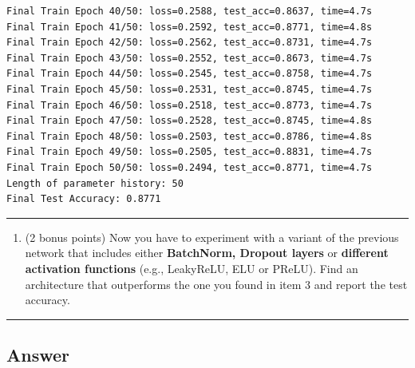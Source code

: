 \documentclass[
  letterpaper,
  DIV=11,
  numbers=noendperiod]{scrartcl}
\newenvironment{Shaded}{\begin{snugshade}}{\end{snugshade}}
\providecommand{\tightlist}{%
  \setlength{\itemsep}{0pt}\setlength{\parskip}{0pt}}\usepackage{longtable,booktabs,array}
\begin{document}
\begin{verbatim}
Final Train Epoch 40/50: loss=0.2588, test_acc=0.8637, time=4.7s
Final Train Epoch 41/50: loss=0.2592, test_acc=0.8771, time=4.8s
Final Train Epoch 42/50: loss=0.2562, test_acc=0.8731, time=4.7s
Final Train Epoch 43/50: loss=0.2552, test_acc=0.8673, time=4.7s
Final Train Epoch 44/50: loss=0.2545, test_acc=0.8758, time=4.7s
Final Train Epoch 45/50: loss=0.2531, test_acc=0.8745, time=4.7s
Final Train Epoch 46/50: loss=0.2518, test_acc=0.8773, time=4.7s
Final Train Epoch 47/50: loss=0.2528, test_acc=0.8745, time=4.8s
Final Train Epoch 48/50: loss=0.2503, test_acc=0.8786, time=4.8s
Final Train Epoch 49/50: loss=0.2505, test_acc=0.8831, time=4.7s
Final Train Epoch 50/50: loss=0.2494, test_acc=0.8771, time=4.7s
Length of parameter history: 50
Final Test Accuracy: 0.8771
\end{verbatim}

\begin{center}\rule{0.5\linewidth}{0.5pt}\end{center}

\begin{enumerate}
\def\labelenumi{\arabic{enumi}.}
\setcounter{enumi}{3}
\tightlist
\item
  (2 bonus points) Now you have to experiment with a variant of the
  previous network that includes either \textbf{BatchNorm, Dropout
  layers} or \textbf{different activation functions} (e.g., LeakyReLU,
  ELU or PReLU). Find an architecture that outperforms the one you found
  in item 3 and report the test accuracy.
\end{enumerate}

\begin{center}\rule{0.5\linewidth}{0.5pt}\end{center}

\subsection{Answer}\label{answer-6}

\begin{Shaded}
\begin{Highlighting}[]

\end{Highlighting}
\end{Shaded}
\end{document}

